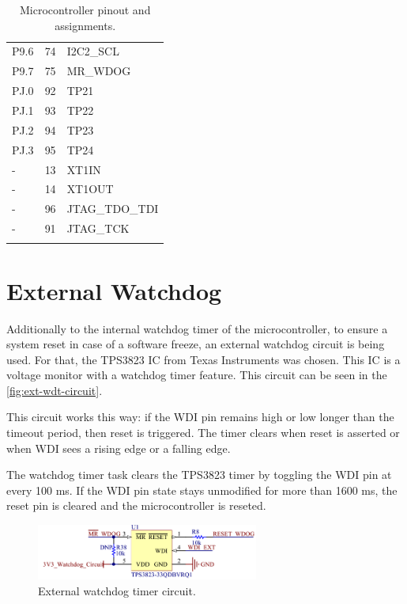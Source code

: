 \begin{longtable}{lcl}
    P9.6              & 74                  & I2C2\_SCL             \\
    P9.7              & 75                  & MR\_WDOG              \\
    \midrule
    PJ.0              & 92                  & TP21                  \\
    PJ.1              & 93                  & TP22                  \\
    PJ.2              & 94                  & TP23                  \\
    PJ.3              & 95                  & TP24                  \\
    \midrule
    -                 & 13                  & XT1IN                 \\
    -                 & 14                  & XT1OUT                \\
    -                 & 96                  & JTAG\_TDO\_TDI        \\
    -                 & 91                  & JTAG\_TCK             \\
    \bottomrule[1.5pt]
    \caption{Microcontroller pinout and assignments.}
    \label{tab:mcu-pinout}
\end{longtable}

\section{External Watchdog}

Additionally to the internal watchdog timer of the microcontroller, to ensure a system reset in case of a software freeze, an external watchdog circuit is being used. For that, the TPS3823 IC from Texas Instruments \cite{tps382x} was chosen. This IC is a voltage monitor with a watchdog timer feature. This circuit can be seen in the \autoref{fig:ext-wdt-circuit}.

This circuit works this way: if the WDI pin remains high or low longer than the timeout period, then reset is triggered. The timer clears when reset is asserted or when WDI sees a rising edge or a falling edge.

The watchdog timer task clears the TPS3823 timer by toggling the WDI pin at every 100 ms. If the WDI pin state stays unmodified for more than 1600 ms, the reset pin is cleared and the microcontroller is reseted.

\begin{figure}[!ht]
    \begin{center}
        \includegraphics[width=0.65\textwidth]{figures/ext-watchdog-circuit.png}
        \caption{External watchdog timer circuit.}
        \label{fig:ext-wdt-circuit}
    \end{center}
\end{figure}

